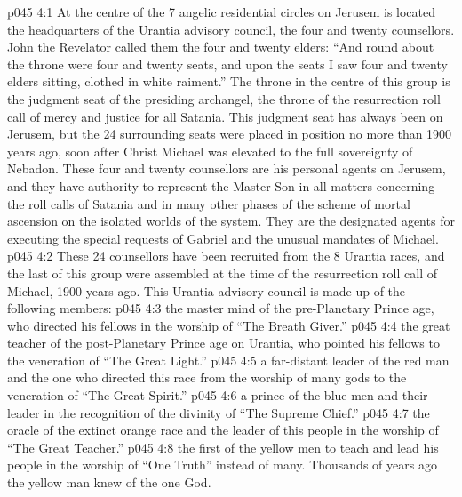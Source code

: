 \vs p045 4:1 At the centre of the 7 angelic residential circles on Jerusem is located the headquarters of the Urantia advisory council, the four and twenty counsellors. John the Revelator called them the four and twenty elders: “And round about the throne were four and twenty seats, and upon the seats I saw four and twenty elders sitting, clothed in white raiment.” The throne in the centre of this group is the judgment seat of the presiding archangel, the throne of the resurrection roll call of mercy and justice for all Satania. This judgment seat has always been on Jerusem, but the 24 surrounding seats were placed in position no more than 1900 years ago, soon after Christ Michael was elevated to the full sovereignty of Nebadon. These four and twenty counsellors are his personal agents on Jerusem, and they have authority to represent the Master Son in all matters concerning the roll calls of Satania and in many other phases of the scheme of mortal ascension on the isolated worlds of the system. They are the designated agents for executing the special requests of Gabriel and the unusual mandates of Michael.
\vs p045 4:2 These 24 counsellors have been recruited from the 8 Urantia races, and the last of this group were assembled at the time of the resurrection roll call of Michael, 1900 years ago. This Urantia advisory council is made up of the following members:
\vs p045 4:3 \bibnobreakspace {} the master mind of the pre\hyp{}Planetary Prince age, who directed his fellows in the worship of “The Breath Giver.”
\vs p045 4:4 \bibnobreakspace {} the great teacher of the post\hyp{}Planetary Prince age on Urantia, who pointed his fellows to the veneration of “The Great Light.”
\vs p045 4:5 \bibnobreakspace {} a far\hyp{}distant leader of the red man and the one who directed this race from the worship of many gods to the veneration of “The Great Spirit.”
\vs p045 4:6 \bibnobreakspace {} a prince of the blue men and their leader in the recognition of the divinity of “The Supreme Chief.”
\vs p045 4:7 \bibnobreakspace {} the oracle of the extinct orange race and the leader of this people in the worship of “The Great Teacher.”
\vs p045 4:8 \bibnobreakspace {} the first of the yellow men to teach and lead his people in the worship of “One Truth” instead of many. Thousands of years ago the yellow man knew of the one God.
